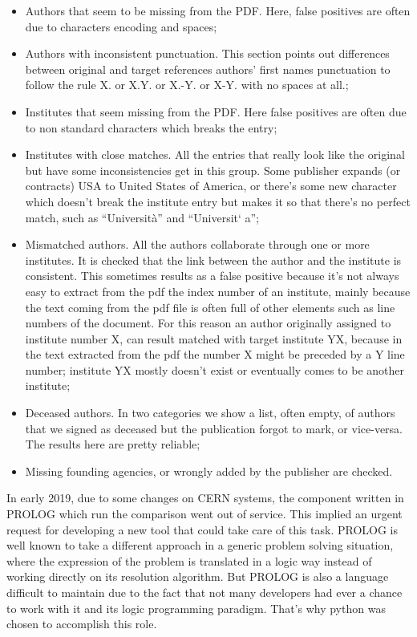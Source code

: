 \begin{itemize}
\item Authors that seem to be missing from the PDF. Here, false positives are often due to characters encoding and spaces;
\item Authors with inconsistent punctuation. This section points out differences between original and target references authors’ first names punctuation to follow the rule X. or X.Y. or X.-Y. or X-Y. with no spaces at all.;
\item Institutes that seem missing from the PDF. Here false positives are often due to non standard characters which breaks the entry;
\item Institutes with close matches. All the entries that really look like the original but have some inconsistencies get in this group. Some publisher expands (or contracts) USA to United States of America, or there’s some new character which doesn’t break the institute entry but makes it so that there’s no perfect match, such as “Università” and “Universit` a”;
\item Mismatched authors. All the authors collaborate through one or more institutes. It is checked that the link between the author and the institute is consistent. This sometimes results as a false positive because it’s not always easy to extract from the pdf the index number of an institute, mainly because the text coming from the pdf file is often full of other elements such as line numbers of the document. For this reason an author originally assigned to institute number X, can result matched with target institute YX, because in the text extracted from the pdf the number X might be preceded by a Y line number; institute YX mostly doesn’t exist or eventually comes to be another institute;
\item Deceased authors. In two categories we show a list, often empty, of authors that we signed as deceased but the publication forgot to mark, or vice-versa. The results here are pretty reliable;
\item Missing founding agencies, or wrongly added by the publisher are checked.
\end{itemize}

In early 2019, due to some changes on CERN systems, the component written in PROLOG which run the comparison went out of service. This implied an urgent request for developing a new tool that could take care of this task. PROLOG is well known to take a different approach in a generic problem solving situation, where the expression of the problem is translated in a logic way instead of working directly on its resolution algorithm. But PROLOG is also a language difficult to maintain due to the fact that not many developers had ever a chance to work with it and its logic programming paradigm. That’s why python was chosen to accomplish this role.

